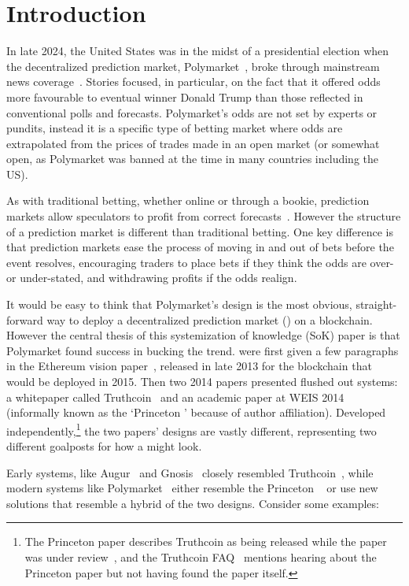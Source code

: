 \section{Introduction}

In late 2024, the United States was in the midst of a presidential election when the decentralized prediction market, Polymarket~\cite{poly}, broke through mainstream news coverage~\cite{YBG24,Cha24}. Stories focused, in particular, on the fact that it offered odds more favourable to eventual winner Donald Trump than those reflected in conventional polls and forecasts. Polymarket's odds are not set by experts or pundits, instead it is a specific type of betting market where odds are extrapolated from the prices of trades made in an open market (or somewhat open, as Polymarket was banned at the time in many countries including the US). 

As with traditional betting, whether online or through a bookie, prediction markets allow speculators to profit from correct forecasts~\cite{AFGH+08,WoZi06}. However the structure of a prediction market is different than traditional betting. One key difference is that prediction markets ease the process of moving in and out of bets before the event resolves, encouraging traders to place bets if they think the odds are over- or under-stated, and withdrawing profits if the odds realign.

It would be easy to think that Polymarket's design is the most obvious, straight-forward way to deploy a decentralized prediction market (\depm) on a blockchain. However the central thesis of this systemization of knowledge (SoK) paper is that Polymarket found success in bucking the trend. \depms were first given a few paragraphs in the Ethereum vision paper~\cite{But13}, released in late 2013 for the blockchain that would be deployed in 2015. Then two 2014 papers presented flushed out systems: a whitepaper called Truthcoin~\cite{Sz14} and an academic paper at WEIS 2014~\cite{BCFKMN14} (informally known as the `Princeton \depm' because of author affiliation). Developed independently,\footnote{The Princeton paper describes Truthcoin as being released while the paper was under review~\cite{BCFKMN14}, and the Truthcoin FAQ~\cite{Sz14b} mentions hearing about the Princeton paper but not having found the paper itself.} the two papers' designs are vastly different, representing two different goalposts for how a \depm might look. 

Early systems, like Augur~\cite{AKPWZ15} and Gnosis~\cite{Gn17} closely resembled Truthcoin~\cite{Sz14}, while modern systems like Polymarket~\cite{poly} either resemble the Princeton \depm~\cite{BCFKMN14} or use new solutions that resemble a hybrid of the two designs. Consider some examples:


